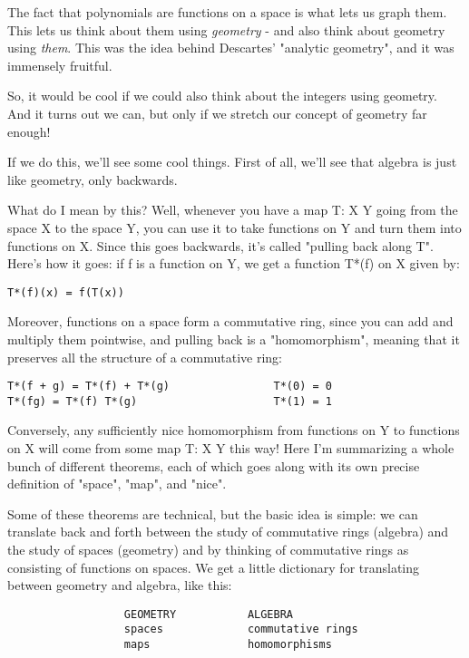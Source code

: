 The fact that polynomials are functions on a space is what lets us 
graph them.  This lets us think about them using \emph{geometry} - and also 
think about geometry using \emph{them}.  This was the idea behind Descartes'
"analytic geometry", and it was immensely fruitful.

So, it would be cool if we could also think about the integers using 
geometry.  And it turns out we can, but only if we stretch our concept 
of geometry far enough!  

If we do this, we'll see some cool things.  First of all, we'll see 
that algebra is just like geometry, only backwards.  

What do I mean by this?  Well, whenever you have a map T: X \to  Y going 
from the space X to the space Y, you can use it to take functions on Y 
and turn them into functions on X.  Since this goes backwards, it's 
called "pulling back along T".  Here's how it goes: if f is a function 
on Y, we get a function T*(f) on X given by:

\begin{verbatim}
T*(f)(x) = f(T(x))
\end{verbatim}
    

Moreover, functions on a space form a commutative ring, since you can 
add and multiply them pointwise, and pulling back is a "homomorphism", 
meaning that it preserves all the structure of a commutative ring:

\begin{verbatim}
T*(f + g) = T*(f) + T*(g)                T*(0) = 0
T*(fg) = T*(f) T*(g)                     T*(1) = 1
\end{verbatim}
    

Conversely, any sufficiently nice homomorphism from functions on Y to 
functions on X will come from some map T: X \to  Y this way!  Here I'm
summarizing a whole bunch of different theorems, each of which goes 
along with its own precise definition of "space", "map", and "nice".  

Some of these theorems are technical, but the basic idea is simple: 
we can translate back and forth between the study of commutative rings 
(algebra) and the study of spaces (geometry) and by thinking of 
commutative rings as consisting of functions on spaces.  We get a little 
dictionary for translating between geometry and algebra, like this:

\begin{verbatim}
                  GEOMETRY           ALGEBRA
                  spaces             commutative rings
                  maps               homomorphisms
\end{verbatim}
    
